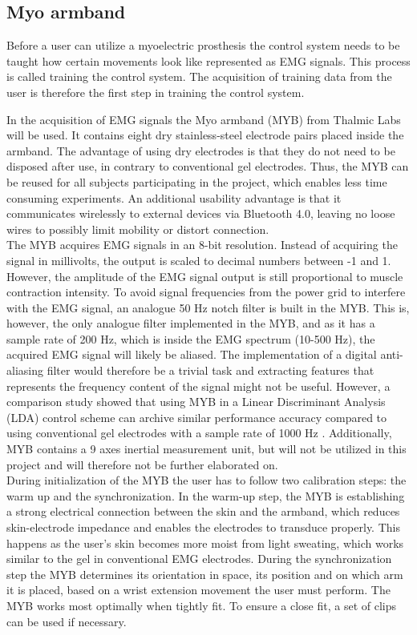 \subsection{Myo armband} \label{sec:MYO}
Before a user can utilize a myoelectric prosthesis the control system needs to be taught how certain movements look like represented as EMG signals. This process is called training the control system. The acquisition of training data from the user is therefore the first step in training the control system.

In the acquisition of EMG signals the Myo armband (MYB) from Thalmic Labs will be used. It contains eight dry stainless-steel electrode pairs placed inside the armband. The advantage of using dry electrodes is that they do not need to be disposed after use, in contrary to conventional gel electrodes. Thus, the MYB can be reused for all subjects participating in the project, which enables less time consuming experiments. An additional usability advantage is that it communicates wirelessly to external devices via Bluetooth 4.0, leaving no loose wires to possibly limit mobility or distort connection. \\ 
The MYB acquires EMG signals in an 8-bit resolution. Instead of acquiring the signal in millivolts, the output is scaled to decimal numbers between -1 and 1. However, the amplitude of the EMG signal output is still proportional to muscle contraction intensity. To avoid signal frequencies from the power grid to interfere with the EMG signal, an analogue 50 Hz notch filter is built in the MYB. This is, however, the only analogue filter implemented in the MYB, and as it has a sample rate of 200 Hz, which is inside the EMG spectrum (10-500 Hz), the acquired EMG signal will likely be aliased. The implementation of a digital anti-aliasing filter would therefore be a trivial task and extracting features that represents the frequency content of the signal might not be useful. However, a comparison study showed that using MYB in a Linear Discriminant Analysis (LDA) control scheme can archive similar performance accuracy compared to using conventional gel electrodes with a sample rate of 1000 Hz \cite{Mendez2017}. Additionally, MYB contains a 9 axes inertial measurement unit, but will not be utilized in this project and will therefore not be further elaborated on. \\
During initialization of the MYB the user has to follow two calibration steps: the warm up and the synchronization. In the warm-up step, the MYB is establishing a strong electrical connection between the skin and the armband, which reduces skin-electrode impedance and enables the electrodes to transduce properly. This happens as the user's skin becomes more moist from light sweating, which works similar to the gel in conventional EMG electrodes. During the synchronization step the MYB determines its orientation in space, its position and on which arm it is placed, based on a wrist extension movement the user must perform. 
The MYB works most optimally when tightly fit. To ensure a close fit, a set of clips can be used if necessary. 

